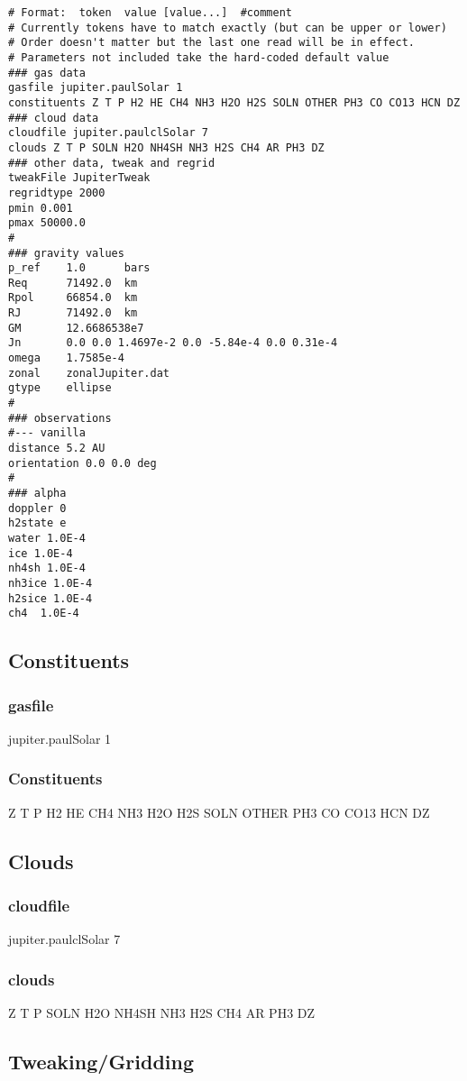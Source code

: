 \documentclass[11pt]{article}
\begin{document}
\begin{verbatim}
# Format:  token  value [value...]  #comment
# Currently tokens have to match exactly (but can be upper or lower)
# Order doesn't matter but the last one read will be in effect.  
# Parameters not included take the hard-coded default value
### gas data
gasfile jupiter.paulSolar 1
constituents Z T P H2 HE CH4 NH3 H2O H2S SOLN OTHER PH3 CO CO13 HCN DZ
### cloud data
cloudfile jupiter.paulclSolar 7
clouds Z T P SOLN H2O NH4SH NH3 H2S CH4 AR PH3 DZ
### other data, tweak and regrid
tweakFile JupiterTweak
regridtype 2000
pmin 0.001
pmax 50000.0
#
### gravity values
p_ref    1.0      bars
Req      71492.0  km
Rpol     66854.0  km
RJ       71492.0  km
GM       12.6686538e7
Jn       0.0 0.0 1.4697e-2 0.0 -5.84e-4 0.0 0.31e-4
omega    1.7585e-4
zonal    zonalJupiter.dat
gtype    ellipse
#
### observations
#--- vanilla
distance 5.2 AU
orientation 0.0 0.0 deg
#
### alpha
doppler 0
h2state e
water 1.0E-4
ice 1.0E-4
nh4sh 1.0E-4
nh3ice 1.0E-4
h2sice 1.0E-4
ch4  1.0E-4
\end{verbatim}

\subsection{Constituents}
\subsubsection{gasfile} 
jupiter.paulSolar 1

\subsubsection{Constituents} 
Z T P H2 HE CH4 NH3 H2O H2S SOLN OTHER PH3 CO CO13 HCN DZ

\subsection{Clouds}
\subsubsection{cloudfile}
jupiter.paulclSolar 7

\subsubsection{clouds}
Z T P SOLN H2O NH4SH NH3 H2S CH4 AR PH3 DZ

\subsection{Tweaking/Gridding}
\end{document}
